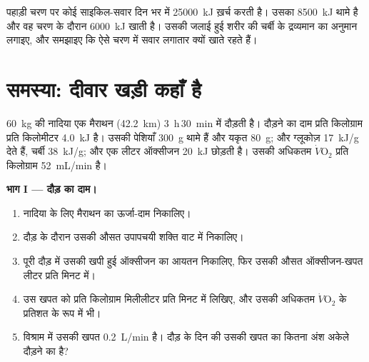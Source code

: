 \begin{exercise}[$\star\star\star$]\label{exo:g10:exercise-and-energy:15}
पहाड़ी चरण पर कोई साइकिल-सवार दिन भर में \qty{25000}{kJ} ख़र्च करती है।
उसका  \qty{8500}{kJ} थामे है और वह चरण के दौरान \qty{6000}{kJ}
खाती है। उसकी जलाई हुई शरीर की चर्बी के द्रव्यमान का अनुमान लगाइए, और
समझाइए कि ऐसे चरण में सवार लगातार क्यों खाते रहते हैं।
\end{exercise}

\section{समस्या: दीवार खड़ी कहाँ है}

\begin{problem}
\label{pb:g10:exercise-and-energy:1}
\qty{60}{kg} की नादिया एक मैराथन (\qty{42.2}{km})
\qty{3}{h}\,\qty{30}{min} में दौड़ती है। दौड़ने का दाम प्रति किलोग्राम
प्रति किलोमीटर \qty{4.0}{kJ} है। उसकी पेशियाँ \qty{300}{g} 
थामे हैं और यकृत \qty{80}{g};  और ग्लूकोज़ \qty{17}{kJ/g} देते
हैं, चर्बी \qty{38}{kJ/g}; और एक लीटर ऑक्सीजन \qty{20}{kJ} छोड़ती है।
उसकी अधिकतम $\dot V\!\mathrm{O_2}$ प्रति किलोग्राम \qty{52}{mL/min} है।

\medskip
\noindent\textbf{भाग I --- दौड़ का दाम।}
\begin{enumerate}
  \item नादिया के लिए मैराथन का ऊर्जा-दाम निकालिए।
  \item दौड़ के दौरान उसकी औसत उपापचयी शक्ति वाट में निकालिए।
  \item पूरी दौड़ में उसकी खपी हुई ऑक्सीजन का आयतन निकालिए, फिर उसकी
        औसत ऑक्सीजन-खपत लीटर प्रति मिनट में।
  \item उस खपत को प्रति किलोग्राम मिलीलीटर प्रति मिनट में लिखिए, और
        उसकी अधिकतम $\dot V\!\mathrm{O_2}$ के प्रतिशत के रूप में भी।
  \item विश्राम में उसकी खपत \qty{0.2}{L/min} है। दौड़ के दिन की उसकी
        खपत का कितना अंश अकेले दौड़ने का है?
\end{enumerate}


\end{problem}
